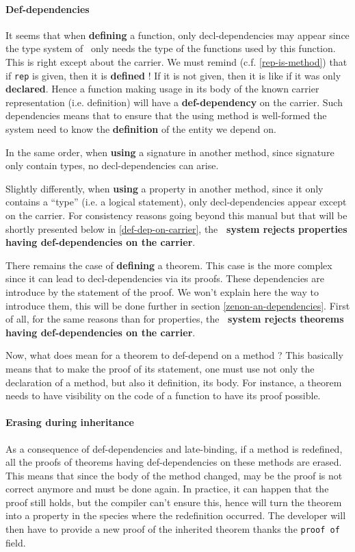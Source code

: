 \paragraph{Def-dependencies}
\label{def-dependency}
It seems that when {\bf defining} a function, only decl-dependencies
may appear since the type system of \focal\ only needs the type of the
functions used by this function. This is right except about the
carrier. We must remind (c.f. \ref{rep-is-method}) that if {\tt rep}
is given, then it is {\bf defined} ! If it is not given, then it is
like if it was only {\bf declared}. Hence a function making usage
in its body of the known carrier representation (i.e. definition) will
have a {\bf def-dependency} on the carrier. Such dependencies means
that to ensure that the using method is well-formed the system need to
know the {\bf definition} of the entity we depend on.


\smallskip
In the same order, when {\bf using} a signature in another method,
since signature only contain types, no decl-dependencies can arise.

\smallskip
{}
Slightly differently, when {\bf using} a property in another method,
since it only contains a ``type'' (i.e. a logical statement), only 
decl-dependencies appear except on the carrier. For consistency
reasons going beyond this manual but that will be shortly presented
below in \ref{def-dep-on-carrier}, the {\bf \focal\ system rejects
properties having def-dependencies on the carrier}.

\smallskip
There remains the case of {\bf defining} a theorem. This case is the
more complex since it can lead to decl-dependencies via its
proofs. These dependencies are introduce by the statement of the
proof. We won't explain here the way to introduce them, this will be
done further in section \ref{zenon-an-dependencies}. First of all, for
the same reasons than for properties, the {\bf \focal\ system rejects
theorems having def-dependencies on the carrier}.

Now, what does mean for a theorem to def-depend on a method ? This
basically means that to make the proof of its statement, one must use
not only the declaration of a method, but also it definition, its
body. For instance, a theorem needs to have visibility on the code of
a function to have its proof possible.



\paragraph{Erasing during inheritance}
\label{erasing}
As a consequence of def-dependencies and late-binding, if a method is
redefined, all the proofs of theorems having def-dependencies on these
methods are erased. This means that since the body of the method
changed, may be the proof is not correct anymore and must be done
again. In practice, it can happen that the proof still holds, but the
compiler can't ensure this, hence will turn the theorem into a property
in the species where the redefinition occurred. The developer will
then have to provide a new proof of the inherited theorem thanks the
{\tt proof of} field.



